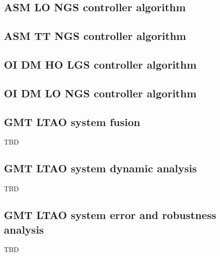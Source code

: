 \subsection{ASM LO NGS controller algorithm}
\subsection{ASM TT NGS controller algorithm}
\subsection{OI DM HO LGS controller algorithm}
\subsection{OI DM LO NGS controller algorithm}

\subsection{GMT LTAO system fusion}
\label{subsec:ltao-system-fusion}

TBD

\subsection{GMT LTAO system dynamic analysis}
\label{subsec:ltao-dynamics}

TBD

\subsection{GMT LTAO system error and robustness analysis}
\label{subsec:ltao-errors}

TBD